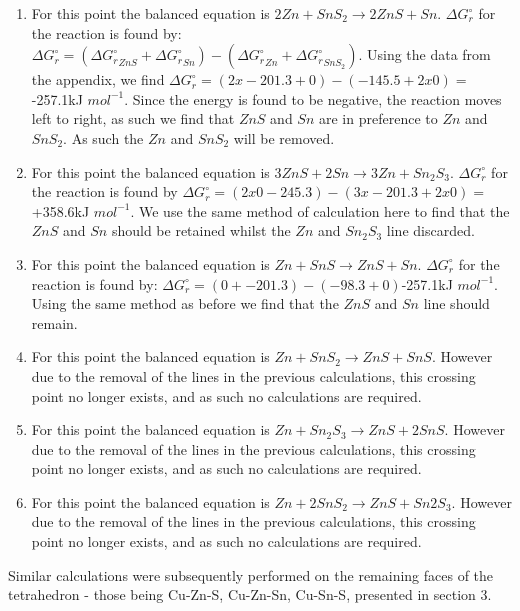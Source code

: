 \begin{enumerate}
\item For this point the balanced equation is $2 Zn + SnS_2 \rightarrow 2 ZnS + Sn$. $\Delta G_{r}^{\circ}$ for the reaction is found by: $\Delta G_{r}^{\circ} = (\Delta {G_{r}^{\circ}}_{ZnS} + \Delta {G_{r}^{\circ}}_{Sn}) - (\Delta {G_{r}^{\circ}}_{Zn} + \Delta {G_{r}^{\circ}}_{SnS_2})$. Using the data from the appendix, we find $\Delta G_{r}^{\circ}=(2x-201.3 + 0)-(-145.5+2x0)=$-257.1kJ $mol^{-1}$. Since the energy is found to be negative, the reaction moves left to right, as such we find that $ZnS$ and $Sn$ are in preference to $Zn$ and $SnS_2$. As such the $Zn$ and $SnS_2$ will be removed.


\item For this point the balanced equation is $ 3 ZnS + 2 Sn \rightarrow 3 Zn + Sn_2S_3$. $\Delta G_{r}^{\circ}$ for the reaction is found by $\Delta G_{r}^{\circ}=(2x0 -245.3)-(3x-201.3+2x0)=$+358.6kJ $mol^{-1}$. We use the same method of calculation here to find that the $ZnS$ and $Sn$ should be retained whilst the $Zn$ and $Sn_2S_3$ line discarded. 


\item For this point the balanced equation is $Zn + SnS \rightarrow ZnS + Sn$. $\Delta G_{r}^{\circ}$ for the reaction is found by: $\Delta G_{r}^{\circ}=(0+ -201.3)-(-98.3+0)$-257.1kJ $mol^{-1}$. Using the same method as before we find that the $ZnS$ and $Sn$ line should remain.
\item For this point the balanced equation is $Zn + SnS_2 \rightarrow ZnS + SnS$. However due to the removal of the lines in the previous calculations, this crossing point no longer exists, and as such no calculations are required.
\item For this point the balanced equation is $Zn + Sn_2S_3 \rightarrow ZnS + 2 SnS$. However due to the removal of the lines in the previous calculations, this crossing point no longer exists, and as such no calculations are required.
\item For this point the balanced equation is $Zn + 2 SnS_2 \rightarrow ZnS + Sn2S_3$. However due to the removal of the lines in the previous calculations, this crossing point no longer exists, and as such no calculations are required.
\end{enumerate}

Similar calculations were subsequently performed on the remaining faces of the tetrahedron - those being Cu-Zn-S, Cu-Zn-Sn, Cu-Sn-S, presented in section 3.


